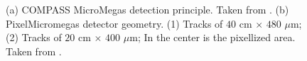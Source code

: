 \begin{figure}[!h]
  \centering
	\caption{(a) COMPASS MicroMegas detection principle. Taken from \cite{NIM}. (b) PixelMicromegas detector geometry. (1) Tracks of $40$ cm $\times$ $480$ $\mu$m; (2) Tracks of $20$ cm $\times$ $400$ $\mu$m; In the center is the pixellized area. Taken from \cite{FloThi}.}
	\label{pic:MM}
\end{figure}

